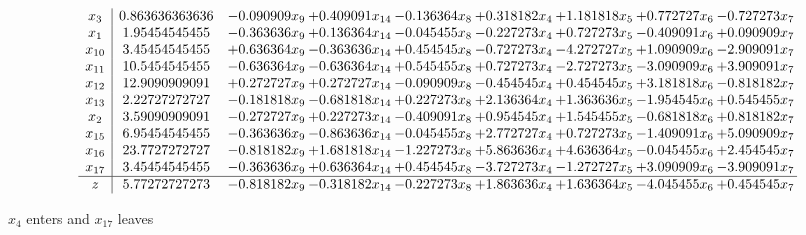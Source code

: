 \documentclass[10pt]{article}
\begin{document}
 \[\begin{array}{c| c c@{\hskip 2pt} c@{\hskip 2pt} c@{\hskip 2pt} c@{\hskip 2pt} c@{\hskip 2pt} c@{\hskip 2pt} c@{\hskip 2pt} }
 x_{3}   &  0.863636363636 & -0.090909 x_{9} & + 0.409091 x_{14} & -0.136364 x_{8} & + 0.318182 x_{4} & + 1.181818 x_{5} & + 0.772727 x_{6} & -0.727273 x_{7}\\
 x_{1}   &  1.95454545455 & -0.363636 x_{9} & + 0.136364 x_{14} & -0.045455 x_{8} & -0.227273 x_{4} & + 0.727273 x_{5} & -0.409091 x_{6} & + 0.090909 x_{7}\\
 x_{10}   &  3.45454545455 & + 0.636364 x_{9} & -0.363636 x_{14} & + 0.454545 x_{8} & -0.727273 x_{4} & -4.272727 x_{5} & + 1.090909 x_{6} & -2.909091 x_{7}\\
 x_{11}   &  10.5454545455 & -0.636364 x_{9} & -0.636364 x_{14} & + 0.545455 x_{8} & + 0.727273 x_{4} & -2.727273 x_{5} & -3.090909 x_{6} & + 3.909091 x_{7}\\
 x_{12}   &  12.9090909091 & + 0.272727 x_{9} & + 0.272727 x_{14} & -0.090909 x_{8} & -0.454545 x_{4} & + 0.454545 x_{5} & + 3.181818 x_{6} & -0.818182 x_{7}\\
 x_{13}   &  2.22727272727 & -0.181818 x_{9} & -0.681818 x_{14} & + 0.227273 x_{8} & + 2.136364 x_{4} & + 1.363636 x_{5} & -1.954545 x_{6} & + 0.545455 x_{7}\\
 x_{2}   &  3.59090909091 & -0.272727 x_{9} & + 0.227273 x_{14} & -0.409091 x_{8} & + 0.954545 x_{4} & + 1.545455 x_{5} & -0.681818 x_{6} & + 0.818182 x_{7}\\
 x_{15}   &  6.95454545455 & -0.363636 x_{9} & -0.863636 x_{14} & -0.045455 x_{8} & + 2.772727 x_{4} & + 0.727273 x_{5} & -1.409091 x_{6} & + 5.090909 x_{7}\\
 x_{16}   &  23.7727272727 & -0.818182 x_{9} & + 1.681818 x_{14} & -1.227273 x_{8} & + 5.863636 x_{4} & + 4.636364 x_{5} & -0.045455 x_{6} & + 2.454545 x_{7}\\
 x_{17}   &  3.45454545455 & -0.363636 x_{9} & + 0.636364 x_{14} & + 0.454545 x_{8} & -3.727273 x_{4} & -1.272727 x_{5} & + 3.090909 x_{6} & -3.909091 x_{7}\\
\hline
z    &  5.77272727273 & -0.818182 x_{9} & -0.318182 x_{14} & -0.227273 x_{8} & + 1.863636 x_{4} & + 1.636364 x_{5} & -4.045455 x_{6} & + 0.454545 x_{7}\\
\end{array}\]


 $ x_{4} $ enters and $ x_{17} $ leaves 
\end{document}
